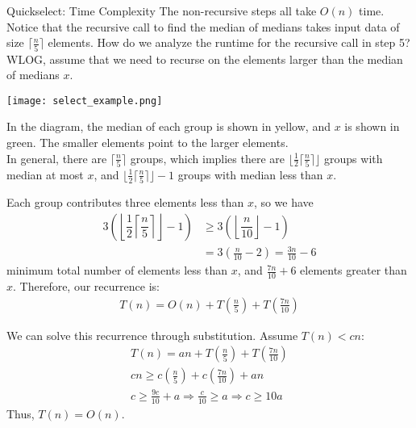 \documentclass{beamer}
\begin{document}
\begin{frame}{Quickselect: Time Complexity}
    The non-recursive steps all take $O(n)$ time. \\[1em]
    Notice that the recursive call to find the median of medians takes input data of size $\lceil \frac{n}{5} \rceil$ elements. How do we analyze the runtime for the recursive call in step 5? \\[1em]
    WLOG, assume that we need to recurse on the elements larger than the median of medians $x$. 
\end{frame}
\begin{frame}
   \begin{center}
        \texttt{[image: select\_example.png]}
   \end{center}
   In the diagram, the median of each group is shown in yellow, and $x$ is shown in green. The smaller elements point to the larger elements. \\[1em]
   In general, there are $\lceil \frac{n}{5} \rceil$ groups, which implies there are $\lfloor \frac{1}{2} \lceil \frac{n}{5} \rceil \rfloor$ groups with median at most $x$, and $\lfloor \frac{1}{2} \lceil \frac{n}{5} \rceil \rfloor - 1$ groups with median less than $x$. 
\end{frame}
\begin{frame}
    Each group contributes three elements less than $x$, so we have 
    \begin{align*}
        3 \left( 
            \left\lfloor\dfrac{1}{2}  \left\lceil \dfrac{n}{5} \right\rceil  \right\rfloor - 1 \right) &\geq 3 \left( 
                \left\lfloor\dfrac{n}{10}\right\rfloor - 1 \right) \\
                &= 3 \left(\frac{n}{10} - 2\right) = \frac{3n}{10} - 6
    \end{align*}
    minimum total number of elements less than $x$, and $\frac{7n}{10} + 6$ elements greater than $x$. Therefore, our recurrence is: 
    \begin{gather*}
        T(n) = O(n) + T \left(\frac{n}{5}\right) + T \left(\frac{7n}{10}\right)
    \end{gather*}
\end{frame}
\begin{frame}
    We can solve this recurrence through substitution. Assume $T(n) < cn$:
    \begin{gather*}
        T(n) = an + T\left(\frac{n}{5}\right) + T\left(\frac{7n}{10}\right) \\
        cn \geq c \left(\frac{n}{5}\right) + c\left(\frac{7n}{10}\right) + an \\
        c \geq \frac{9c}{10} + a \Longrightarrow \frac{c}{10} \geq a  \Longrightarrow c \geq 10 a 
    \end{gather*}
    Thus, $T(n) = O(n)$. 
\end{frame}
\end{document}
